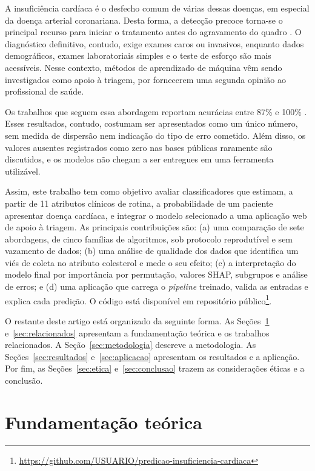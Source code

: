 \documentclass[12pt]{article}
\begin{document}
A insuficiência cardíaca é o desfecho comum de várias dessas doenças, em
especial da doença arterial coronariana. Desta forma, a detecção precoce
torna-se o principal recurso para iniciar o tratamento antes do agravamento
do quadro \cite{who:25}. O diagnóstico definitivo, contudo, exige exames
caros ou invasivos, enquanto dados demográficos, exames laboratoriais simples
e o teste de esforço são mais acessíveis. Nesse contexto, métodos de
aprendizado de máquina vêm sendo investigados como apoio à triagem, por
fornecerem uma segunda opinião ao profissional de saúde.

Os trabalhos que seguem essa abordagem reportam acurácias entre 87\% e 100\%
\cite{amin:19,mohan:19,ali:21}. Esses resultados, contudo, costumam ser
apresentados como um único número, sem medida de dispersão nem indicação do
tipo de erro cometido. Além disso, os valores ausentes registrados como zero
nas bases públicas raramente são discutidos, e os modelos não chegam a ser
entregues em uma ferramenta utilizável.

Assim, este trabalho tem como objetivo avaliar classificadores que estimam, a
partir de 11 atributos clínicos de rotina, a probabilidade de um paciente
apresentar doença cardíaca, e integrar o modelo selecionado a uma aplicação
web de apoio à triagem. As principais contribuições são: (a) uma comparação
de sete abordagens, de cinco famílias de algoritmos, sob protocolo
reprodutível e sem vazamento de dados; (b) uma análise de qualidade dos dados
que identifica um viés de coleta no atributo colesterol e mede o seu efeito;
(c) a interpretação do modelo final por importância por permutação, valores
SHAP, subgrupos e análise de erros; e (d) uma aplicação que carrega o
\textit{pipeline} treinado, valida as entradas e explica cada predição. O
código está disponível em repositório público\footnote{%
\url{https://github.com/USUARIO/predicao-insuficiencia-cardiaca}}.

O restante deste artigo está organizado da seguinte forma. As
Seções~\ref{sec:fundamentacao} e~\ref{sec:relacionados} apresentam a
fundamentação teórica e os trabalhos relacionados. A
Seção~\ref{sec:metodologia} descreve a metodologia. As
Seções~\ref{sec:resultados} e~\ref{sec:aplicacao} apresentam os resultados e
a aplicação. Por fim, as Seções~\ref{sec:etica} e~\ref{sec:conclusao} trazem
as considerações éticas e a conclusão.

\section{Fundamentação teórica}
\label{sec:fundamentacao}
\end{document}
